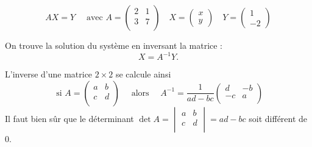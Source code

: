 {\begin{enumerate}
{\begin{enumerate}
$$AX=Y \quad \text{  avec } A = \begin{pmatrix} 2 & 1 \\ 3 & 7 \\ \end{pmatrix}
\quad X = \begin{pmatrix} x \\ y \end{pmatrix} \quad Y = \begin{pmatrix} 1 \\ -2 \end{pmatrix}$$

On trouve la solution du système en inversant la matrice :
$$X = A^{-1} Y.$$

L'inverse d'une matrice $2\times 2$ se calcule ainsi
$$\text{ si } A = \begin{pmatrix} a & b \\ c & d \\ \end{pmatrix} \quad \text{ alors } \quad
A^{-1} = \frac{1}{ad-bc}\begin{pmatrix} d & -b \\ -c & a \\ \end{pmatrix}$$
Il faut bien sûr que le déterminant $\det A = \begin{vmatrix}  a & b \\ c & d \\ \end{vmatrix}=ad-bc$ 
soit différent de $0$.


\end{enumerate}}
\end{enumerate}}
